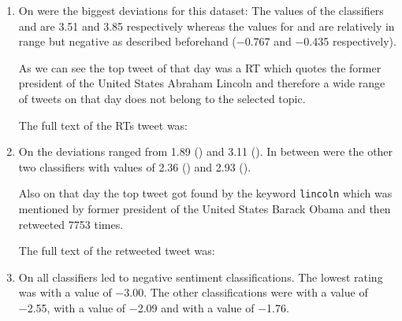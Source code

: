 \begin{enumerate}
    \item 
        On  were the biggest deviations for this dataset:
        The values of the classifiers \ftb{} and \fme{} are \num{3.51} and \num{3.85} respectively whereas the values for \fnb{} and \fsvm{} are relatively in range but negative as described beforehand (\num{-0.767} and \num{-0.435} respectively).

        
        As we can see the top tweet of that day was a \ac{RT} which quotes the former president of the United States Abraham Lincoln and therefore a wide range of tweets on that day does not belong to the selected topic.

        The full text of the \acp{RT} tweet was:

    \item 
        On  the deviations ranged from \num{1.89} (\ftb{}) and \num{3.11} (\fnb{}).
        In between were the other two classifiers with values of \num{2.36} (\fme{}) and \num{2.93} (\fsvm{}).


        Also on that day the top tweet got found by the keyword \texttt{lincoln} which was mentioned by former president of the United States Barack Obama and then retweeted \num{7753} times.

        The full text of the retweeted tweet was:

    \item 
        On  all classifiers led to negative sentiment classifications.
        The lowest rating was \fnb{} with a value of \num{-3.00}.
        The other classifications were \fsvm{} with a value of \num{-2.55}, \fme{} with a value of \num{-2.09} and \ftb{} with a value of \num{-1.76}.



\end{enumerate}
